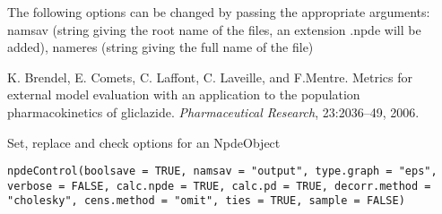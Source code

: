 \documentclass[a4paper]{book}
\begin{document}
%
\begin{Details}\relax
The following options can be changed by passing the appropriate arguments: namsav (string giving the root name of the files, an extension .npde will be added), nameres (string giving the full name of the file)
\end{Details}
%
\begin{References}\relax
K. Brendel, E. Comets, C. Laffont, C. Laveille, and F.Mentre. Metrics for external model evaluation with an application to the population pharmacokinetics of gliclazide. \emph{Pharmaceutical Research}, 23:2036--49, 2006.
\end{References}
%
\begin{Description}\relax
Set, replace and check options for an NpdeObject
\end{Description}
%
\begin{Usage}
\begin{verbatim}
npdeControl(boolsave = TRUE, namsav = "output", type.graph = "eps", verbose = FALSE, calc.npde = TRUE, calc.pd = TRUE, decorr.method = "cholesky", cens.method = "omit", ties = TRUE, sample = FALSE)
\end{verbatim}
\end{Usage}
%
\end{document}
